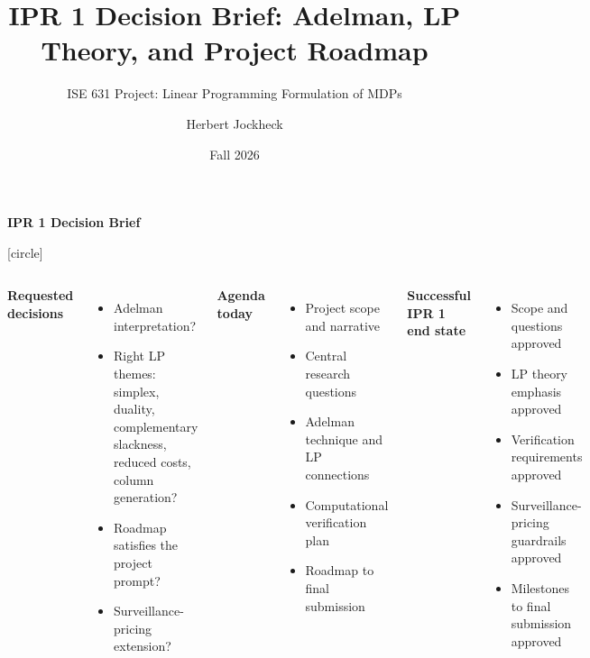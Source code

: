 \documentclass[aspectratio=169,9pt]{beamer}
\title[IPR 1 Decision Brief]{IPR 1 Decision Brief: Adelman, LP Theory, and Project Roadmap}
\subtitle{ISE 631 Project: Linear Programming Formulation of MDPs}
\author{Herbert Jockheck}
\date{Fall 2026}
\begin{document}
{%
\begin{frame}[plain,t]
\noindent\fontsize{10}{12}\selectfont\textbf{IPR 1 Decision Brief}\par
\vspace{0.35em}

\fontsize{10}{12}\selectfont
{}
[circle]

\begin{center}
\end{center}

\vspace{0.45em}
\begin{columns}[T,onlytextwidth]
\raggedright
\textbf{Requested decisions}
\begin{itemize}
    \setlength\itemsep{0em}
    \item Adelman interpretation?
    \item Right LP themes: simplex, duality, complementary slackness, reduced costs, column generation?
    \item Roadmap satisfies the project prompt?
    \item Surveillance-pricing extension?
\end{itemize}

\raggedright
\textbf{Agenda today}
\begin{itemize}
    \setlength\itemsep{0em}
    \item Project scope and narrative
    \item Central research questions
    \item Adelman technique and LP connections
    \item Computational verification plan
    \item Roadmap to final submission
\end{itemize}

\raggedright
\textbf{Successful IPR 1 end state}
\begin{itemize}
    \setlength\itemsep{0em}
    \item Scope and questions approved
    \item LP theory emphasis approved
    \item Verification requirements approved
    \item Surveillance-pricing guardrails approved
    \item Milestones to final submission approved
\end{itemize}
\end{columns}
\end{frame}
}
\end{document}

